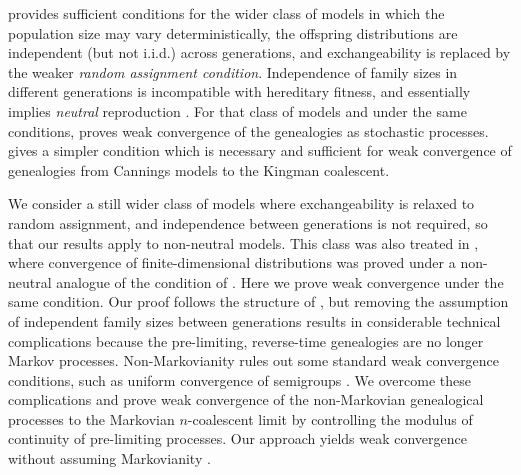 \documentclass[12pt,authoryear]{article}
\theoremstyle{definition}
\newcommand{\1}[1]{\mathbbm{1}_{#1}}
\begin{document}
\citet{mohle1998} provides sufficient conditions for the wider class of models in which the population size may vary deterministically, the offspring distributions are independent (but not i.i.d.) across generations, and exchangeability is replaced by the weaker \emph{random assignment condition}.
Independence of family sizes in different generations is incompatible with hereditary fitness, and essentially implies \emph{neutral} reproduction \citep{delmoral2009}.
For that class of models and under the same conditions, \citet{mohle1999} proves weak convergence of the genealogies as stochastic processes.
\citet{mohle2000} gives a simpler condition which is necessary and sufficient for weak convergence of genealogies from Cannings models to the Kingman coalescent.

We consider a still wider class of models where exchangeability is relaxed to random assignment, and independence between generations is not required, so that our results apply to non-neutral models.
This class was also treated in \citet{brown2021}, where convergence of finite-dimensional distributions was proved under a non-neutral analogue of the condition of \citet{mohle2000}.
Here we prove weak convergence under the same condition.
Our proof follows the structure of \citet[Theorem 3.1]{mohle1999}, but removing the assumption of independent family sizes between generations results in considerable technical complications because the pre-limiting, reverse-time genealogies are no longer Markov processes.
Non-Markovianity rules out some standard weak convergence conditions, such as uniform convergence of semigroups \cite[Chapter 4, Theorem 2.5]{ethier1986}.
We overcome these complications and prove weak convergence of the non-Markovian genealogical processes to the Markovian $n$-coalescent limit by controlling the modulus of continuity of pre-limiting processes.
Our approach yields weak convergence without assuming Markovianity \cite[Chapter 3, Corollary 7.4 and Theorem 7.8]{ethier1986}.
\end{document}
